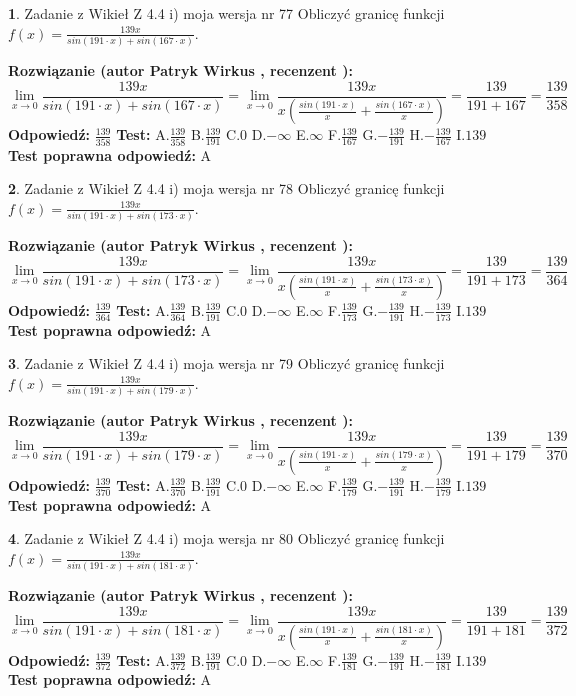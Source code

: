 \documentclass[12pt, a4paper]{article}
\theoremstyle{definition} %
\newtheorem{zad}{}
\newcommand{\zadStart}[1]{\begin{zad}#1\newline}
\newcommand{\zadStop}{\end{zad}}
\newcommand{\rozwStart}[2]{\noindent \textbf{Rozwiązanie (autor #1 , recenzent #2): }\newline}
\newcommand{\rozwStop}{\newline}
\newcommand{\odpStart}{\noindent \textbf{Odpowiedź:}\newline}
\newcommand{\odpStop}{\newline}
\newcommand{\testStart}{\noindent \textbf{Test:}\newline}
\newcommand{\testStop}{\newline}
\newcommand{\kluczStart}{\noindent \textbf{Test poprawna odpowiedź:}\newline}
\newcommand{\kluczStop}{\newline}
\begin{document}
\zadStart{Zadanie z Wikieł Z 4.4 i) moja wersja nr 77}
Obliczyć granicę funkcji $f(x)=\frac{139x}{sin(191\cdot x) +sin(167\cdot x)}$.
\zadStop
\rozwStart{Patryk Wirkus}{}
$$\lim\limits_{x\to 0}\frac{139x}{sin(191\cdot x) +sin(167\cdot x)}=\lim\limits_{x\to 0}\frac{139x}{x(\frac{sin(191\cdot x)}{x}+\frac{sin(167\cdot x)}{x})}=\frac{139}{191+167} = \frac{139}{358}$$
\rozwStop
\odpStart
$\frac{139}{358}$
\odpStop
\testStart
A.$\frac{139}{358}$
B.$\frac{139}{191}$
C.$0$
D.$-\infty$
E.$\infty$
F.$\frac{139}{167}$
G.$-\frac{139}{191}$
H.$-\frac{139}{167}$
I.$139$
\testStop
\kluczStart
A
\kluczStop



\zadStart{Zadanie z Wikieł Z 4.4 i) moja wersja nr 78}
Obliczyć granicę funkcji $f(x)=\frac{139x}{sin(191\cdot x) +sin(173\cdot x)}$.
\zadStop
\rozwStart{Patryk Wirkus}{}
$$\lim\limits_{x\to 0}\frac{139x}{sin(191\cdot x) +sin(173\cdot x)}=\lim\limits_{x\to 0}\frac{139x}{x(\frac{sin(191\cdot x)}{x}+\frac{sin(173\cdot x)}{x})}=\frac{139}{191+173} = \frac{139}{364}$$
\rozwStop
\odpStart
$\frac{139}{364}$
\odpStop
\testStart
A.$\frac{139}{364}$
B.$\frac{139}{191}$
C.$0$
D.$-\infty$
E.$\infty$
F.$\frac{139}{173}$
G.$-\frac{139}{191}$
H.$-\frac{139}{173}$
I.$139$
\testStop
\kluczStart
A
\kluczStop



\zadStart{Zadanie z Wikieł Z 4.4 i) moja wersja nr 79}
Obliczyć granicę funkcji $f(x)=\frac{139x}{sin(191\cdot x) +sin(179\cdot x)}$.
\zadStop
\rozwStart{Patryk Wirkus}{}
$$\lim\limits_{x\to 0}\frac{139x}{sin(191\cdot x) +sin(179\cdot x)}=\lim\limits_{x\to 0}\frac{139x}{x(\frac{sin(191\cdot x)}{x}+\frac{sin(179\cdot x)}{x})}=\frac{139}{191+179} = \frac{139}{370}$$
\rozwStop
\odpStart
$\frac{139}{370}$
\odpStop
\testStart
A.$\frac{139}{370}$
B.$\frac{139}{191}$
C.$0$
D.$-\infty$
E.$\infty$
F.$\frac{139}{179}$
G.$-\frac{139}{191}$
H.$-\frac{139}{179}$
I.$139$
\testStop
\kluczStart
A
\kluczStop



\zadStart{Zadanie z Wikieł Z 4.4 i) moja wersja nr 80}
Obliczyć granicę funkcji $f(x)=\frac{139x}{sin(191\cdot x) +sin(181\cdot x)}$.
\zadStop
\rozwStart{Patryk Wirkus}{}
$$\lim\limits_{x\to 0}\frac{139x}{sin(191\cdot x) +sin(181\cdot x)}=\lim\limits_{x\to 0}\frac{139x}{x(\frac{sin(191\cdot x)}{x}+\frac{sin(181\cdot x)}{x})}=\frac{139}{191+181} = \frac{139}{372}$$
\rozwStop
\odpStart
$\frac{139}{372}$
\odpStop
\testStart
A.$\frac{139}{372}$
B.$\frac{139}{191}$
C.$0$
D.$-\infty$
E.$\infty$
F.$\frac{139}{181}$
G.$-\frac{139}{191}$
H.$-\frac{139}{181}$
I.$139$
\testStop
\kluczStart
A
\kluczStop
\end{document}
